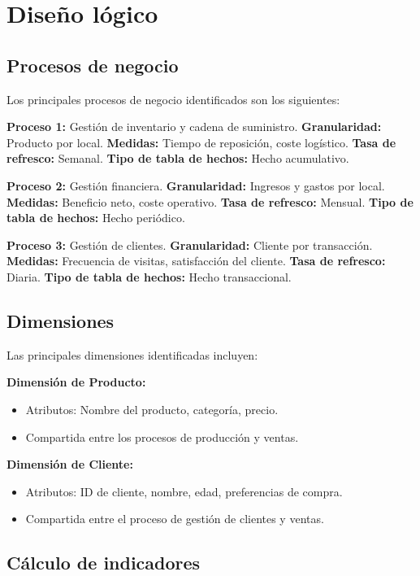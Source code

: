 \documentclass[12pt]{opticajnl}
\begin{document}
\newpage

\section{Diseño lógico}

\subsection{Procesos de negocio}

Los principales procesos de negocio identificados son los siguientes:

\textbf{Proceso 1:} Gestión de inventario y cadena de suministro.  
\textbf{Granularidad:} Producto por local.  
\textbf{Medidas:} Tiempo de reposición, coste logístico.  
\textbf{Tasa de refresco:} Semanal.  
\textbf{Tipo de tabla de hechos:} Hecho acumulativo.

\textbf{Proceso 2:} Gestión financiera.  
\textbf{Granularidad:} Ingresos y gastos por local.  
\textbf{Medidas:} Beneficio neto, coste operativo.  
\textbf{Tasa de refresco:} Mensual.  
\textbf{Tipo de tabla de hechos:} Hecho periódico.

\textbf{Proceso 3:} Gestión de clientes.  
\textbf{Granularidad:} Cliente por transacción.  
\textbf{Medidas:} Frecuencia de visitas, satisfacción del cliente.  
\textbf{Tasa de refresco:} Diaria.  
\textbf{Tipo de tabla de hechos:} Hecho transaccional.

\subsection{Dimensiones}
Las principales dimensiones identificadas incluyen:

\textbf{Dimensión de Producto:} 
\begin{itemize}
    \item Atributos: Nombre del producto, categoría, precio.
    \item Compartida entre los procesos de producción y ventas.
\end{itemize}

\textbf{Dimensión de Cliente:} 
\begin{itemize}
    \item Atributos: ID de cliente, nombre, edad, preferencias de compra.
    \item Compartida entre el proceso de gestión de clientes y ventas.
\end{itemize}

\subsection{Cálculo de indicadores}
\end{document}
